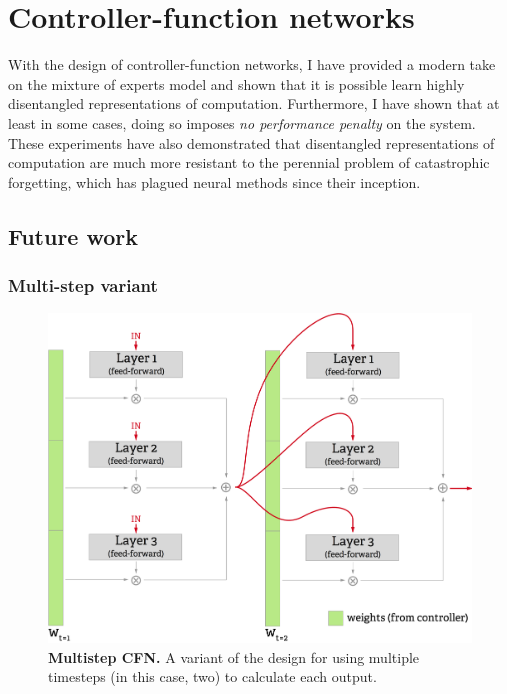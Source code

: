 \documentclass[12pt,twoside]{mitthesis}
\begin{document}
\section{Controller-function
networks}\label{controller-function-networks-1}

With the design of controller-function networks, I have provided a
modern take on the mixture of experts model and shown that it is
possible learn highly disentangled representations of computation.
Furthermore, I have shown that at least in some cases, doing so imposes
\emph{no performance penalty} on the system. These experiments have also
demonstrated that disentangled representations of computation are much
more resistant to the perennial problem of catastrophic forgetting,
which has plagued neural methods since their inception.

\subsection{Future work}\label{future-work-1}

\subsubsection{Multi-step variant}\label{sec:multistep}

\begin{figure}[htbp]
\centering
\includegraphics{../figures/multistep_small.png}
\caption{\label{fig:multistep}\textbf{Multistep CFN.} A variant of the
design for using multiple timesteps (in this case, two) to calculate
each output.}
\end{figure}
\end{document}
